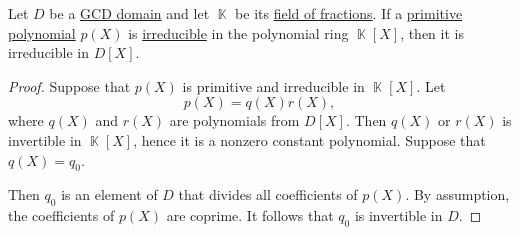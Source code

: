 \begin{lemma}\label{thm:irreducible_primitive_polynomial_in_field_of_fractions}
  Let \( D \) be a \hyperref[def:gcd_domain]{GCD domain} and let \( \BbbK \) be its \hyperref[thm:field_of_fractions]{field of fractions}. If a \hyperref[def:polynomial_content]{primitive polynomial} \( p(X) \) is \hyperref[def:domain_divisibility/irreducible]{irreducible} in the polynomial ring \( \BbbK[X] \), then it is irreducible in \( D[X] \).
\end{lemma}
\begin{proof}
  Suppose that \( p(X) \) is primitive and irreducible in \( \BbbK[X] \). Let
  \begin{equation*}
    p(X) = q(X) r(X),
  \end{equation*}
  where \( q(X) \) and \( r(X) \) are polynomials from \( D[X] \). Then \( q(X) \) or \( r(X) \) is invertible in \( \BbbK[X] \), hence it is a nonzero constant polynomial. Suppose that \( q(X) = q_0 \).

  Then \( q_0 \) is an element of \( D \) that divides all coefficients of \( p(X) \). By assumption, the coefficients of \( p(X) \) are coprime. It follows that \( q_0 \) is invertible in \( D \).
\end{proof}

